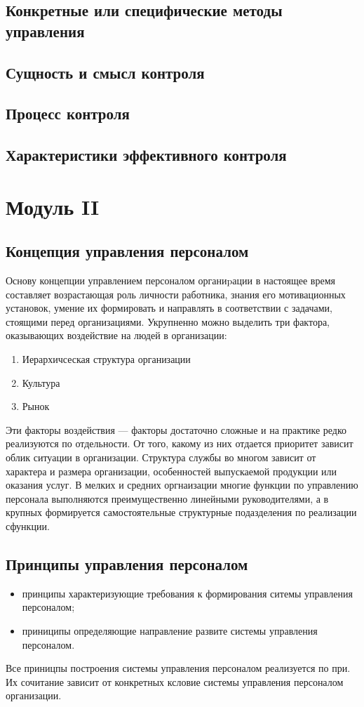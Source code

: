 \documentclass[a4paper,12pt,oneside,final]{extarticle}
\numberwithin{equation}{section}
\begin{document}
\subsection{Конкретные или специфические методы управления}

\subsection{Сущность и смысл контроля}

\subsection{Процесс контроля}

\subsection{Характеристики эффективного контроля}

%
%
\section{Модуль II}
\subsection{Концепция управления персоналом}
Основу концепции управлением персоналом органиpации в настоящее время составляет возрастающая роль личности работника, знания его мотивационных установок, умение их формировать и направлять в соответствии с задачами, стоящими перед организациями. 
Укрупненно можно выделить три фактора, оказывающих воздействие на людей в организации:
\begin{enumerate}
	\item Иерархичсеская структура организации
	\item Культура
	\item Рынок
\end{enumerate}
Эти факторы воздействия --- факторы достаточно сложные и на практике редко реализуются по отдельности. 
От того, какому из них отдается приоритет зависит облик ситуации в организации.
Структура службы во многом зависит от характера и размера организации, особенностей выпускаемой продукции или оказания услуг.
В мелких и средних оргнаизации многие функции по управлению персонала выполняются преимущественно линейными руководителями, а в крупных формируется самостоятельные структурные подазделения по реализации сфункции.

\subsection{Принципы управления персоналом}
\begin{itemize}
	\item принципы характеризующие требования к формирования ситемы управления персоналом;
	\item приниципы определяющие направление развите системы управления персоналом.
\end{itemize}
Все приницпы построения системы управления персоналом реализуется по при. Их сочитание зависит от конкретных ксловие системы управления персоналом организации.
\end{document}
